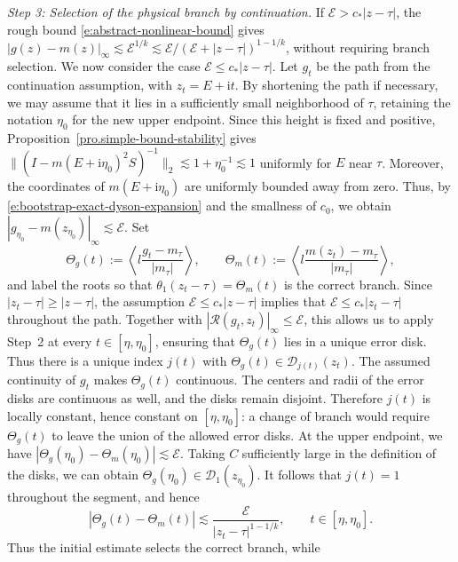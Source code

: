 \documentclass[11pt,twoside, a4paper]{article}
\numberwithin{equation}{section}
\numberwithin{figure}{section}
\theoremstyle{plain} %
\theoremstyle{definition}
\theoremstyle{remark}
\newcommand{\1} {\mspace{1 mu}}
\newcommand{\2} {\mspace{2 mu}}
\begin{document}
\medskip
\noindent
\emph{Step 3: Selection of the physical branch by continuation.}
If $\mathcal{E}>c_*|z-\tau|$, the rough bound
\eqref{e:abstract-nonlinear-bound} gives
$|g(z)-m(z)|_\infty\lesssim\mathcal{E}^{1/k}\lesssim\mathcal{E}/
(\mathcal{E}+|z-\tau|)^{1-1/k}$, without requiring
branch selection. 
We now consider the case $\mathcal{E}\le c_*|z-\tau|$.
Let $g_t$ be the path from the continuation assumption,
with $z_t=E+\mathrm it$.
By shortening the path if necessary, we may assume
that it lies in a sufficiently small neighborhood
of $\tau$, retaining the notation $\eta_0$ for
the new upper endpoint. Since this height is fixed
and positive, Proposition~\ref{pro.simple-bound-stability}
gives
$
    \bigl\|(I-m(E+\mathrm i\eta_0)^2S)^{-1}\bigr\|_2
    \lesssim 1+\eta_0^{-1}\lesssim 1
$
uniformly for $E$ near $\tau$.
Moreover, the coordinates of $m(E+\mathrm i\eta_0)$
are uniformly bounded away from zero.
Thus, by \eqref{e:bootstrap-exact-dyson-expansion}
and the smallness of $c_0$, we obtain
$
    |g_{\eta_0}-m(z_{\eta_0})|_\infty
    \lesssim\mathcal E.
$
Set
\[
\Theta_g(t):=
\left\langle l\frac{g_t-m_\tau}{|m_\tau|}\right\rangle,
\qquad
\Theta_m(t):=
\left\langle l\frac{m(z_t)-m_\tau}{|m_\tau|}\right\rangle,
\]
and label the roots so that
$\theta_1(z_t-\tau)=\Theta_m(t)$ is the correct branch.
Since $|z_t-\tau|\ge |z-\tau|$, the assumption
$\mathcal{E}\le c_*|z-\tau|$ implies that
$\mathcal{E}\le c_*|z_t-\tau|$ throughout the path.
Together with $|\mathcal{R}(g_t,z_t)|_\infty\le\mathcal{E}$,
this allows us to apply Step~2 at every
$t\in[\eta,\eta_0]$, ensuring that $\Theta_g(t)$
lies in a unique error disk. Thus there is a unique index $j(t)$ with
$
\Theta_g(t)\in\mathcal D_{j(t)}(z_t).
$
The assumed continuity of $g_t$ makes $\Theta_g(t)$ continuous.
The centers and radii of the error disks are continuous as
well, and the disks remain disjoint. Therefore $j(t)$ is
locally constant, hence constant on $[\eta,\eta_0]$:
a change of branch would require $\Theta_g(t)$ to leave the
union of the allowed error disks.
At the upper endpoint, we have
$
|\Theta_g(\eta_0)-\Theta_m(\eta_0)|\lesssim\mathcal{E}.
$
Taking $C$ sufficiently large in the definition of the
disks, we can obtain $\Theta_g(\eta_0)\in\mathcal D_1(z_{\eta_0})$.
It follows that $j(t)=1$ throughout the segment, and hence
\begin{equation}
\label{e:abstract-scalar-linear-stability}
|\Theta_g(t)-\Theta_m(t)|
\lesssim
\frac{\mathcal{E}}{|z_t-\tau|^{1-1/k}},
\qquad t\in[\eta,\eta_0].
\end{equation}
Thus the initial estimate selects the correct branch, while
\end{document}
